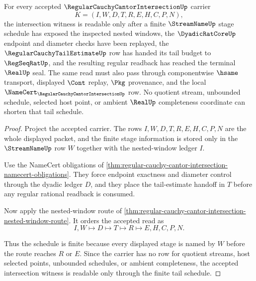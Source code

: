 \begin{theorem}
\label{thm:regular-cauchy-cantor-intersection-tail-schedule}
For every accepted $\RegularCauchyCantorIntersectionUp$ carrier
$$
K=(I,W,D,T,R,E,H,C,P,N),
$$
the intersection witness is readable only after a finite $\StreamNameUp$ stage schedule has exposed the inspected nested windows, the $\DyadicRatCoreUp$ endpoint and diameter checks have been replayed, the $\RegularCauchyTailEstimateUp$ row has handed its tail budget to $\RegSeqRatUp$, and the resulting regular readback has reached the terminal $\RealUp$ seal. The same read must also pass through componentwise $\hsame$ transport, displayed $\Cont$ replay, $\Pkg$ provenance, and the local $\NameCert_{\RegularCauchyCantorIntersectionUp}$ row. No quotient stream, unbounded schedule, selected host point, or ambient $\RealUp$ completeness coordinate can shorten that tail schedule.
\end{theorem}
\begin{proof}
Project the accepted carrier. The rows $I,W,D,T,R,E,H,C,P,N$ are the whole displayed packet, and the finite stage information is stored only in the $\StreamNameUp$ row $W$ together with the nested-window ledger $I$.

Use the NameCert obligations of \autoref{thm:regular-cauchy-cantor-intersection-namecert-obligations}. They force endpoint exactness and diameter control through the dyadic ledger $D$, and they place the tail-estimate handoff in $T$ before any regular rational readback is consumed.

Now apply the nested-window route of \autoref{thm:regular-cauchy-cantor-intersection-nested-window-route}. It orders the accepted read as
$$
I,W \longmapsto D \longmapsto T \longmapsto R \longmapsto E,H,C,P,N .
$$

Thus the schedule is finite because every displayed stage is named by $W$ before the route reaches $R$ or $E$. Since the carrier has no row for quotient streams, host selected points, unbounded schedules, or ambient completeness, the accepted intersection witness is readable only through the finite tail schedule.
\end{proof}


